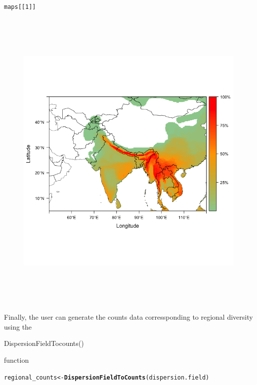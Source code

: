 \documentclass[12pt]{article}\usepackage[]{graphicx}\usepackage[usenames,dvipsnames]{color}
\makeatletter
\newcommand{\hlnum}[1]{\textcolor[rgb]{0.686,0.059,0.569}{#1}}%
\newcommand{\hlstd}[1]{\textcolor[rgb]{0.345,0.345,0.345}{#1}}%
\newcommand{\hlkwb}[1]{\textcolor[rgb]{0.69,0.353,0.396}{#1}}%
\newcommand{\hlkwd}[1]{\textcolor[rgb]{0.737,0.353,0.396}{\textbf{#1}}}%
\newenvironment{kframe}{%
 \def\at@end@of@kframe{}%
 \ifinner\ifhmode%
  \def\at@end@of@kframe{\end{minipage}}%
  \begin{minipage}{\columnwidth}%
 \fi\fi%
 \def\FrameCommand##1{\hskip\@totalleftmargin \hskip-\fboxsep
 \colorbox{shadecolor}{##1}\hskip-\fboxsep
     \hskip-\linewidth \hskip-\@totalleftmargin \hskip\columnwidth}%
 \MakeFramed {\advance\hsize-\width
   \@totalleftmargin\z@ \linewidth\hsize
   \@setminipage}}%
 {\par\unskip\endMakeFramed%
 \at@end@of@kframe}
\newenvironment{knitrout}{}{} %
\makeatother
\begin{document}
\begin{knitrout}
\color{fgcolor}\begin{kframe}
\begin{alltt}
\hlstd{maps[[}\hlnum{1}\hlstd{]]}
\end{alltt}
\end{kframe}
\end{knitrout}

\begin{figure}[htp]
\begin{center}
\includegraphics[width=6in,height=6in]{figure/maps.png}
\end{center}
\end{figure}



Finally, the user can generate the counts data corressponding to regional diversity using the \begin{verb} DispersionFieldTocounts() \end{verb} function

\begin{knitrout}
\color{fgcolor}\begin{kframe}
\begin{alltt}
\hlstd{regional_counts} \hlkwb{<-} \hlkwd{DispersionFieldToCounts}\hlstd{(dispersion.field)}
\end{alltt}
\end{kframe}
\end{knitrout}
\end{document}
